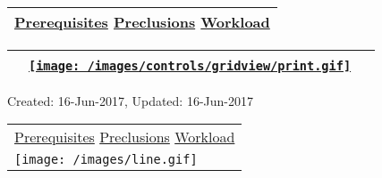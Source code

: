 ~

\hypertarget{ctl00_ctl00_ContentPlaceHolder1_ContentPlaceHolder1_pnlReferences}{}
\begin{longtable}[]{@{}l@{}}
\toprule
\protect\hypertarget{ctl00_ctl00_ContentPlaceHolder1_ContentPlaceHolder1_lblSectionBottom}{}{\protect\hyperlink{Prerequisites}{Prerequisites}
\textbar{} \protect\hyperlink{Preclusions}{Preclusions} \textbar{}
\protect\hyperlink{Workload}{Workload}}\tabularnewline
\bottomrule
\end{longtable}

\hypertarget{ctl00_ctl00_ContentPlaceHolder1_ContentPlaceHolder1_UP}{}
\hypertarget{contentstart}{}
\hypertarget{ctl00_ctl00_ContentPlaceHolder1_ContentPlaceHolder1_pnlMain}{}
\begin{longtable}[]{@{}ll@{}}
\toprule
&
{\href{javascript:PrintThisPage();}{\texttt{[image: /images/controls/gridview/print.gif]}}~~}\tabularnewline
\bottomrule
\end{longtable}

\protect\hypertarget{ctl00_ctl00_ContentPlaceHolder1_ContentPlaceHolder1_LV_UpdateInfo_ctrl0_txtDate}{}{Created:
16-Jun-2017, Updated: 16-Jun-2017}

\begin{longtable}[]{@{}l@{}}
\toprule
\protect\hypertarget{ctl00_ctl00_ContentPlaceHolder1_ContentPlaceHolder1_lblSectionTop}{}{\protect\hyperlink{Prerequisites}{Prerequisites}
\textbar{} \protect\hyperlink{Preclusions}{Preclusions} \textbar{}
\protect\hyperlink{Workload}{Workload}}\tabularnewline
\texttt{[image: /images/line.gif]}\tabularnewline
\bottomrule
\end{longtable}

